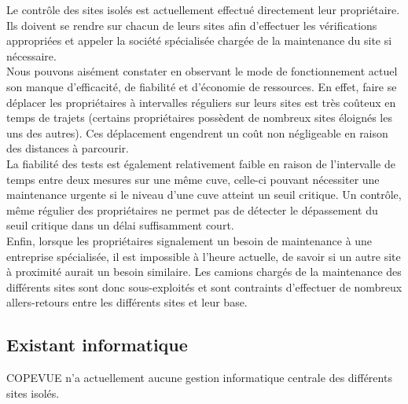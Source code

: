 Le contrôle des sites isolés est actuellement effectué directement leur propriétaire. Ils doivent se rendre sur chacun de leurs sites afin d'effectuer les vérifications appropriées et appeler la société spécialisée chargée de la maintenance du site si nécessaire.\\
Nous pouvons aisément constater en observant le mode de fonctionnement actuel son manque d'efficacité, de fiabilité et d'économie de ressources. En effet, faire se déplacer les propriétaires à intervalles réguliers sur leurs sites est très coûteux en temps de trajets (certains propriétaires possèdent de nombreux sites éloignés les uns des autres). Ces déplacement engendrent un coût non négligeable en raison des distances à parcourir. \\
La fiabilité des tests est également relativement faible en raison de l'intervalle de temps entre deux mesures sur une même cuve, celle-ci pouvant nécessiter une maintenance urgente si le niveau d'une cuve atteint un seuil critique. Un contrôle, même régulier des propriétaires ne permet pas de détecter le dépassement du seuil critique dans un délai suffisamment court.\\
Enfin, lorsque les propriétaires signalement un besoin de maintenance à une entreprise spécialisée, il est impossible à l'heure actuelle, de savoir si un autre site à proximité aurait un besoin similaire. Les camions chargés de la maintenance des différents sites sont donc sous-exploités et sont contraints d'effectuer de nombreux allers-retours entre les différents sites et leur base.

\subsection {Existant informatique}

COPEVUE n'a actuellement aucune gestion informatique centrale des différents sites isolés.
